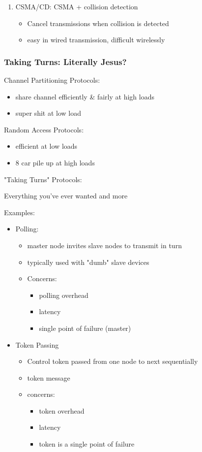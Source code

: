\documentclass{article}
\begin{document}
\begin{enumerate}
	\item CSMA/CD: CSMA + collision detection
	\begin{itemize}
		\item Cancel transmissions when collision is detected
		\item easy in wired transmission, difficult wirelessly
	\end{itemize}
\end{enumerate}

\subsubsection*{Taking Turns: Literally Jesus?}

Channel Partitioning Protocols:
\begin{itemize}
	\item share channel efficiently \& fairly at high loads
	\item super shit at low load
\end{itemize}

\noindent Random Access Protocols:
\begin{itemize}
	\item efficient at low loads
	\item 8 car pile up at high loads
\end{itemize}

\noindent "Taking Turns" Protocols:

Everything you've ever wanted and more

\noindent Examples:
\begin{itemize}
	\item Polling:
	\begin{itemize}
		\item master node invites slave nodes to transmit in turn
		\item typically used with "dumb" slave devices
		\item Concerns:
		\begin{itemize}
			\item polling overhead
			\item latency
			\item single point of failure (master)
		\end{itemize}
	\end{itemize}
	\item Token Passing
	\begin{itemize}
		\item Control token passed from one node to next sequentially
		\item token message
		\item concerns:
		\begin{itemize}
			\item token overhead
			\item latency
			\item token is a single point of failure
		\end{itemize}
	\end{itemize}
\end{itemize}
\end{document}
